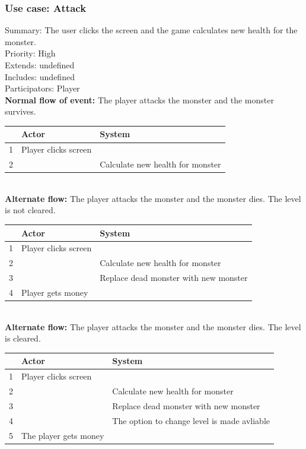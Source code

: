 \documentclass{article}
\begin{document}
\subsubsection{Use case: Attack}
Summary: The user clicks the screen and the game calculates new health for the monster.\\
Priority: High\\
Extends: undefined\\
Includes: undefined\\
Participators: Player\\
\textbf{Normal flow of event:} The player attacks the monster and the monster survives.
\vspace{1 mm}\\
\begin{tabular}{|c|l|l|} \hline
  & Actor & System \\ \hline
1 & Player clicks screen & \\ \hline
2 & & Calculate new health for monster\\ \hline
\end{tabular}\\
\newpage
\noindent
\textbf{Alternate flow:} The player attacks the monster and the monster dies. The level is not cleared.
\vspace{1 mm}\\
\begin{tabular}{|c|l|l|} \hline
    & Actor & System \\ \hline
    1 & Player clicks screen & \\ \hline
    2 & & Calculate new health for monster\\ \hline
    3 & & Replace dead monster with new monster \\ \hline
    4 & Player gets money & \\ \hline
\end{tabular}
\vspace{5 mm}\\
\textbf{Alternate flow:} The player attacks the monster and the monster dies. The level is cleared.
\vspace{1 mm}\\
\begin{tabular}{| c | l | l |} \hline
    & Actor & System \\ \hline
    1 & Player clicks screen & \\ \hline
    2 & & Calculate new health for monster\\ \hline
    3 & & Replace dead monster with new monster \\ \hline
    4 & & The option to change level is made avliable\\ \hline
    5 & The player gets money & \\ \hline
\end{tabular}
\\
\end{document}
